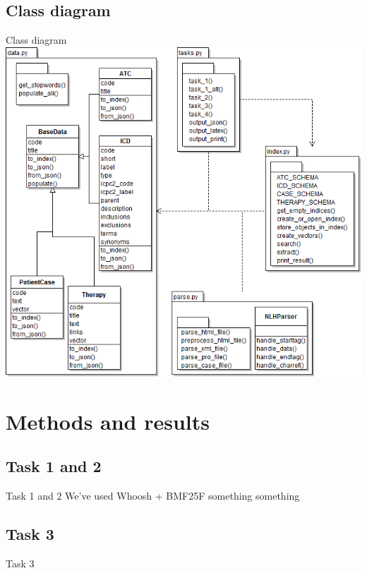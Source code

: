 \documentclass[screen, compress]{beamer}
\begin{document}
\subsection{Class diagram}
\begin{frame}{Class diagram}
\includegraphics[width=\textwidth,height=0.92\textheight]{img/class_diagram}
\end{frame}


\section{Methods and results}

\subsection{Task 1 and 2}
\begin{frame}{Task 1 and 2}
We've used Whoosh + BMF25F something something
\end{frame}


\subsection{Task 3}
\begin{frame}{Task 3}
\end{frame}
\end{document}
